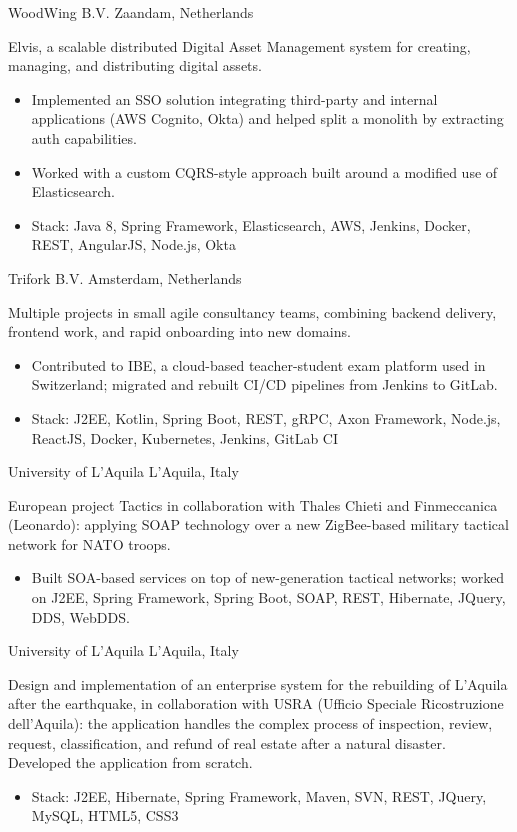 \documentclass[10pt,a4paper,sans]{moderncv}
\begin{document}
{WoodWing B.V.}
{Zaandam, Netherlands}
{}{Elvis, a scalable distributed Digital Asset Management system for creating, managing, and distributing digital assets.
\begin{itemize}
 \item Implemented an SSO solution integrating third-party and internal applications (AWS Cognito, Okta) and helped split a monolith by extracting auth capabilities.
 \item Worked with a custom CQRS-style approach built around a modified use of Elasticsearch.
 \item Stack: Java 8, Spring Framework, Elasticsearch, AWS, Jenkins, Docker, REST, AngularJS, Node.js, Okta
\end{itemize}
}

{Trifork B.V.}
{Amsterdam, Netherlands}
{}{Multiple projects in small agile consultancy teams, combining backend delivery, frontend work, and rapid onboarding into new domains.
\begin{itemize}
 \item Contributed to IBE, a cloud-based teacher-student exam platform used in Switzerland; migrated and rebuilt CI/CD pipelines from Jenkins to GitLab.
 \item Stack: J2EE, Kotlin, Spring Boot, REST, gRPC, Axon Framework, Node.js, ReactJS, Docker, Kubernetes, Jenkins, GitLab CI
\end{itemize}
}

{University of L'Aquila}
{L'Aquila, Italy}
{}{European project Tactics in collaboration with Thales Chieti and Finmeccanica (Leonardo): applying SOAP technology over a new ZigBee-based military tactical network for NATO troops.
\begin{itemize}
 \item Built SOA-based services on top of new-generation tactical networks; worked on J2EE, Spring Framework, Spring Boot, SOAP, REST, Hibernate, JQuery, DDS, WebDDS.
\end{itemize}
}

{University of L'Aquila}
{L'Aquila, Italy}
{}{Design and implementation of an enterprise system for the rebuilding of L'Aquila after the earthquake, in collaboration with USRA (Ufficio Speciale Ricostruzione dell'Aquila): the application handles the complex process of inspection, review, request, classification, and refund of real estate after a natural disaster. Developed the application from scratch.
\begin{itemize}
 \item Stack: J2EE, Hibernate, Spring Framework, Maven, SVN, REST, JQuery, MySQL, HTML5, CSS3
\end{itemize}
}
\end{document}
